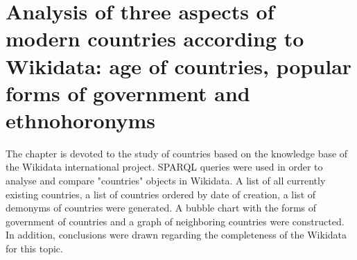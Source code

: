\setchapterpreamble[u]{\margintoc}
\chapter{Analysis of three aspects of modern countries according to Wikidata: age of countries, popular forms of government and ethnohoronyms}


The chapter is devoted to the study of countries based on the knowledge base of the Wikidata international project. SPARQL queries were used in order to analyse and compare "countries" objects in Wikidata. A list of all currently existing countries, a list of countries ordered by date of creation, a list of demonyms of countries were generated. A bubble chart with the forms of government of countries and a graph of neighboring countries were constructed. In addition, conclusions were drawn regarding the completeness of the Wikidata for this topic.
